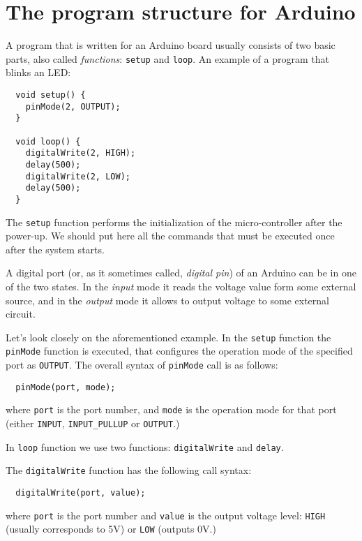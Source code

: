 \documentclass[../sparc.tex]{subfiles}
\begin{document}
\section{The program structure for Arduino}

A program that is written for an Arduino board usually consists of two basic
parts, also called \emph{functions}: \texttt{setup} and \texttt{loop}.  An
example of a program that blinks an LED:

\begin{verbatim}
  void setup() {
    pinMode(2, OUTPUT);
  }

  void loop() {
    digitalWrite(2, HIGH);
    delay(500);
    digitalWrite(2, LOW);
    delay(500);
  }
\end{verbatim}


The \texttt{setup} function performs the initialization of the micro-controller
after the power-up.  We should put here all the commands that must be executed
once after the system starts.

A digital port (or, as it sometimes called, \emph{digital pin}) of an Arduino
can be in one of the two states.  In the \emph{input} mode it reads the voltage
value form some external source, and in the \emph{output} mode it allows to
output voltage to some external circuit.

Let's look closely on the aforementioned example.  In the \texttt{setup}
function the \texttt{pinMode} function is executed, that configures the
operation mode of the specified port as \texttt{OUTPUT}.  The overall syntax of
\texttt{pinMode} call is as follows:

\begin{verbatim}
  pinMode(port, mode);
\end{verbatim}

where \texttt{port} is the port number, and \texttt{mode} is the operation mode
for that port (either \texttt{INPUT}, \texttt{INPUT\_PULLUP} or
\texttt{OUTPUT}.)

In \texttt{loop} function we use two functions: \texttt{digitalWrite} and
\texttt{delay}.

The \texttt{digitalWrite} function has the following call syntax:

\begin{verbatim}
  digitalWrite(port, value);
\end{verbatim}

where \texttt{port} is the port number and \texttt{value} is the output voltage
level: \texttt{HIGH} (usually corresponds to 5V) or \texttt{LOW} (outputs 0V.)
\end{document}
